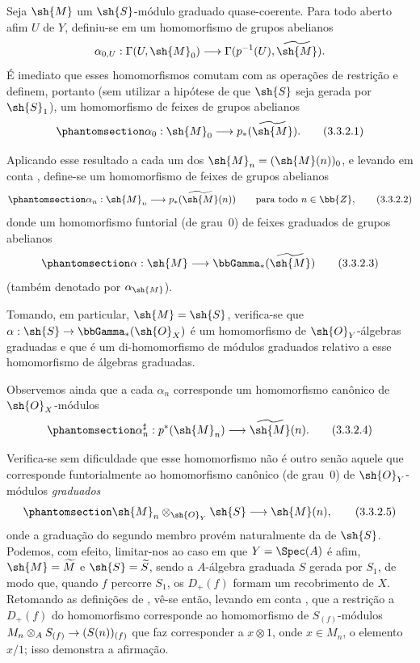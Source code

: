 \documentclass[oneside,10pt]{amsart}
\makeatletter
\newcommand{\ega@arrow}[2]{\mathchoice{#1}{#2}{#2}{#2}}
\renewcommand{\to}{\ega@arrow{\longrightarrow}{\rightarrow}}
\newcommand{\oldpage}[2][]{\marginnote{\normalfont\footnotesize\textbf{#1}~|~#2}\ignorespaces}
\let\EGAOriginalLabel\label
\renewcommand{\label}[1]{\phantomsection\EGAOriginalLabel{#1}}
\makeatother
\begin{document}
\begin{env}[3.3.2]
\label{II.3.3.2}
Seja $\sh{M}$ um $\sh{S}$-módulo graduado quase-coerente.
Para todo aberto afim $U$ de $Y$, definiu-se em  um homomorfismo de grupos abelianos
\[
  \alpha_{0,U}:\Gamma(U,\sh{M}_0)\to\Gamma(p^{-1}(U),\widetilde{\sh{M}}).
\]
É imediato que esses homomorfismos comutam com as operações de restrição  e definem, portanto (sem utilizar a hipótese de que $\sh{S}$ seja gerada por $\sh{S}_1$), um homomorfismo de feixes de grupos abelianos
\[
\label{II.3.3.2.1}
  \alpha_0:\sh{M}_0\to p_*(\widetilde{\sh{M}}).
\tag{3.3.2.1}
\]

Aplicando esse resultado a cada um dos $\sh{M}_n=(\sh{M}(n))_0$, e levando em conta , define-se um homomorfismo de feixes de grupos abelianos
\[
\label{II.3.3.2.2}
  \alpha_n:\sh{M}_n\to p_*(\widetilde{\sh{M}}(n))
  \qquad\text{para todo }n\in\bb{Z},
\tag{3.3.2.2}
\]
donde um homomorfismo funtorial (de grau~$0$) de feixes graduados de grupos abelianos
\[
\label{II.3.3.2.3}
  \alpha:\sh{M}\to\bbGamma_*(\widetilde{\sh{M}})
\tag{3.3.2.3}
\]
(também denotado por $\alpha_{\sh{M}}$).

Tomando, em particular, $\sh{M}=\sh{S}$, verifica-se que $\alpha:\sh{S}\to\bbGamma_*(\sh{O}_X)$ é um homomorfismo de $\sh{O}_Y$-álgebras graduadas e que  é um di-homomorfismo de módulos graduados relativo a esse homomorfismo de álgebras graduadas.

Observemos ainda que a cada $\alpha_n$ corresponde  um homomorfismo canônico de $\sh{O}_X$-módulos
\[
\label{II.3.3.2.4}
  \alpha_n^\sharp:p^*(\sh{M}_n)\to\widetilde{\sh{M}}(n).
\tag{3.3.2.4}
\]

Verifica-se sem dificuldade que esse homomorfismo não é outro senão aquele que corresponde funtorialmente  ao homomorfismo canônico (de grau~$0$) de $\sh{O}_Y$-módulos \emph{graduados}
\[
\label{II.3.3.2.5}
  \sh{M}_n\otimes_{\sh{O}_Y}\sh{S}\to\sh{M}(n),
\tag{3.3.2.5}
\]
\oldpage[II]{58}
onde a graduação do segundo membro provém naturalmente da de $\sh{S}$.
Podemos, com efeito, limitar-nos ao caso em que $Y=\Spec(A)$ é afim, $\sh{M}=\widetilde{M}$ e $\sh{S}=\widetilde{S}$, sendo a $A$-álgebra graduada $S$ gerada por $S_1$, de modo que, quando $f$ percorre $S_1$, os $D_+(f)$ formam um recobrimento de $X$.
Retomando as definições de , vê-se então, levando em conta , que a restrição a $D_+(f)$ do homomorfismo  corresponde  ao homomorfismo de $S_{(f)}$-módulos $M_n\otimes_A S_{(f)}\to(S(n))_{(f)}$ que faz corresponder a $x\otimes1$, onde $x\in M_n$, o elemento $x/1$;
isso demonstra a afirmação.
\end{env}
\end{document}

